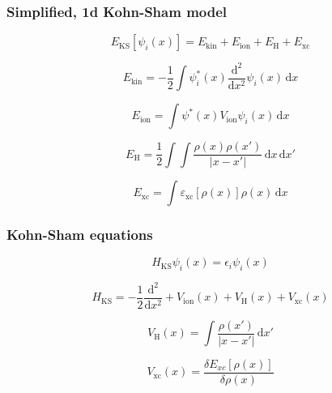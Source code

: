 \begin{frame}
\frametitle{Simplified, 1d Kohn-Sham model}

\begin{equation*}
E_{\mathrm{KS}}[\psi_{i}(x)] = E_{\mathrm{kin}} + E_{\mathrm{ion}} +
E_{\mathrm{H}} + E_{\mathrm{xc}}
\end{equation*}

\begin{equation*}
E_{\mathrm{kin}} = -\frac{1}{2} \int \psi^{*}_{i}(x)
\frac{\mathrm{d}^2}{\mathrm{d}x^2} \psi_{i}(x) \, \mathrm{d}x
\end{equation*}


\begin{equation*}
E_{\mathrm{ion}} = \int \psi^{*}(x) V_{\mathrm{ion}} \psi_{i}(x) \, \mathrm{d}x
\end{equation*}

\begin{equation*}
E_{\mathrm{H}} = \frac{1}{2} \int \int \frac{\rho(x) \rho(x')}{\left| x - x' \right|}
\,\mathrm{d}x \,\mathrm{d}x'
\end{equation*}

\begin{equation*}
E_{\mathrm{xc}} = \int \varepsilon_{\mathrm{xc}}[\rho(x)]
\rho(x) \, \mathrm{d}x
\end{equation*}

\end{frame}



\begin{frame}
\frametitle{Kohn-Sham equations}

\begin{equation*}
H_{\mathrm{KS}} \psi_{i}(x) = \epsilon_{i} \psi_{i}(x)
\end{equation*}

\begin{equation*}
H_{\mathrm{KS}} =
-\frac{1}{2} \frac{\mathrm{d}^2}{\mathrm{d}x^2} +
V_{\mathrm{ion}}(x) + V_{\mathrm{H}}(x) + V_{\mathrm{xc}}(x)
\end{equation*}


\begin{equation*}
V_{\mathrm{H}}(x) = \int \frac{\rho(x')}{\left| x - x' \right|} \,\mathrm{d}x'
\end{equation*}


\begin{equation*}
V_{\mathrm{xc}}(x) = \frac{\delta E_{xc}[\rho(x)] }{\delta \rho(x)}
\end{equation*}

\end{frame}



